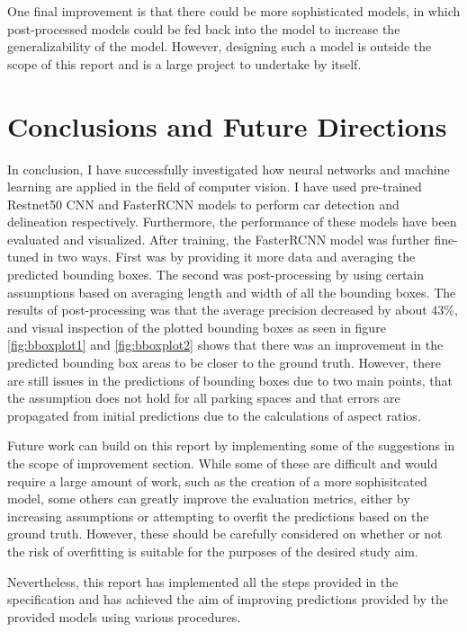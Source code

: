 \documentclass[man]{apa7}
\begin{document}
One final improvement is that there could be more sophisticated models, in which post-processed models could be fed back into the model to increase the generalizability of the model. However, designing such a model is outside the scope of this report and is a large project to undertake by itself.

\newpage

\section{Conclusions and Future Directions}

In conclusion, I have successfully investigated how neural networks and machine learning are applied in the field of computer vision. I have used pre-trained Restnet50 CNN and FasterRCNN models to perform car detection and delineation respectively. Furthermore, the performance of these models have been evaluated and visualized. After training, the FasterRCNN model was further fine-tuned in two ways. First was by providing it more data and averaging the predicted bounding boxes. The second was post-processing by using certain assumptions based on averaging length and width of all the bounding boxes. The results of post-processing was that the average precision decreased by about 43\%, and visual inspection of the plotted bounding boxes as seen in figure \ref{fig:bboxplot1} and \ref{fig:bboxplot2} shows that there was an improvement in the predicted bounding box areas to be closer to the ground truth. However, there are still issues in the predictions of bounding boxes due to two main points, that the assumption does not hold for all parking spaces and that errors are propagated from initial predictions due to the calculations of aspect ratios.

Future work can build on this report by implementing some of the suggestions in the scope of improvement section. While some of these are difficult and would require a large amount of work, such as the creation of a more sophisitcated model, some others can greatly improve the evaluation metrics, either by increasing assumptions or attempting to overfit the predictions based on the ground truth. However, these should be carefully considered on whether or not the risk of overfitting is suitable for the purposes of the desired study aim.

Nevertheless, this report has implemented all the steps provided in the specification and has achieved the aim of improving predictions provided by the provided models using various procedures. 
\end{document}
